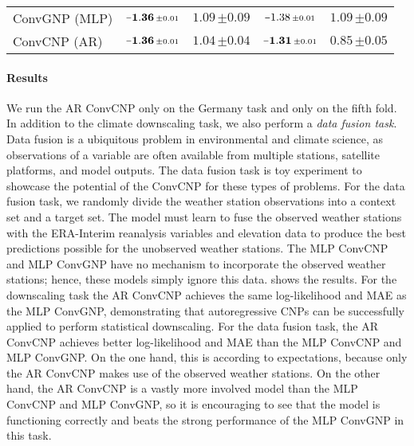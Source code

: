 \documentclass[12pt, twoside]{report}
\begin{document}
\begin{table}[t]
\begin{tabular}{lcccc}
        ConvGNP (MLP)
            & $\mathbf{\shortminus 1.36} \, {\scriptstyle \pm 0.01}$
            & $1.09 \, {\scriptstyle \pm 0.09}$
            & $\shortminus 1.38 \, {\scriptstyle \pm 0.01}$
            & $1.09 \, {\scriptstyle \pm 0.09}$ \\
        ConvCNP (AR)
            & $\mathbf{\shortminus 1.36} \, {\scriptstyle \pm 0.01}$
            & $1.04 \, {\scriptstyle \pm 0.04}$
            & $\mathbf{\shortminus 1.31} \, {\scriptstyle \pm 0.01}$
            & $\mathbf{0.85} \, {\scriptstyle \pm 0.05}$ \\
        \bottomrule
    \end{tabular}
\end{table}

\paragraph{Results}
We run the AR ConvCNP only on the Germany task and only on the fifth fold.
In addition to the climate downscaling task,
we also perform a \emph{data fusion task}.
Data fusion is a ubiquitous problem in environmental and climate science,
as observations of a variable are often available from multiple stations, satellite platforms, and model outputs.
The data fusion task is toy experiment to showcase the potential of the ConvCNP for these types of problems.
For the data fusion task, we randomly divide the weather station observations into a context set and a target set.
The model must learn to fuse the observed weather stations with the ERA-Interim reanalysis variables and elevation data to produce the best predictions possible for the unobserved weather stations.
The MLP ConvCNP and MLP ConvGNP have no mechanism to incorporate the observed weather stations;
hence, these models simply ignore this data.
 shows the results.
For the downscaling task the AR ConvCNP achieves the same log-likelihood and MAE as the MLP ConvGNP,
demonstrating that autoregressive CNPs can be successfully applied to perform statistical downscaling.
For the data fusion task, the AR ConvCNP achieves better log-likelihood and MAE than the MLP ConvCNP and MLP ConvGNP.
On the one hand, this is according to expectations, because only the AR ConvCNP makes use of the observed weather stations.
On the other hand, the AR ConvCNP is a vastly more involved model than the MLP ConvCNP and MLP ConvGNP,
so it is encouraging to see that the model is functioning correctly and beats the strong performance of the MLP ConvGNP in this task.
\end{document}
